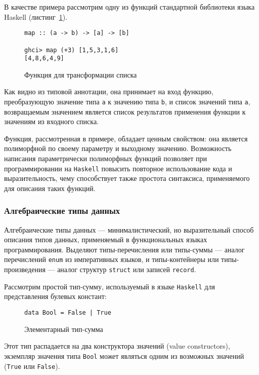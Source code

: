 В качестве примера рассмотрим одну из функций стандартной библиотеки языка Haskell (листинг~\ref{listing:map}).

\begin{figure}[h]
\begin{lstlisting}
map :: (a -> b) -> [a] -> [b]

ghci> map (+3) [1,5,3,1,6]
[4,8,6,4,9]
\end{lstlisting}
\caption{Функция для трансформации списка}
\label{listing:map}
\end{figure}

Как видно из типовой аннотации, она принимает на вход функцию, преобразующую значение типа \lstinline{a} к значению типа \lstinline{b}, и список значений типа \lstinline{a}, возвращаемым значением является список результатов применения функции к значениям из входного списка.

Функция, рассмотренная в примере, обладает ценным свойством: она является полиморфной по своему параметру и выходному значению. Возможность написания параметрически полиморфных функций позволяет при программировании на \lstinline{Haskell} повысить повторное использование кода и выразительность, чему способствует также простота синтаксиса, применяемого для описания таких функций.

\subsubsection{Алгебраические типы данных}

Алгебраические типы данных --- минималистический, но выразительный способ описания типов данных, применяемый в функциональных языках программирования. Выделяют типы-перечисления или типы-суммы --- аналог перечислений \lstinline{enum} из императивных языков, и типы-контейнеры или типы-произведения --- аналог структур \lstinline{struct} или записей \lstinline{record}.


Рассмотрим простой тип-сумму, используемый в языке \lstinline{Haskell} для представления булевых констант:

\begin{figure}[h]
\begin{lstlisting}
data Bool = False | True
\end{lstlisting}
\caption{Элементарный тип-сумма}
\label{listing:Bool}
\end{figure}

Этот тип распадается на два конструктора значений (value constructors), экземпляр значения типа \lstinline{Bool} может являться одним из возможных значений (\lstinline{True} или \lstinline{False}).


